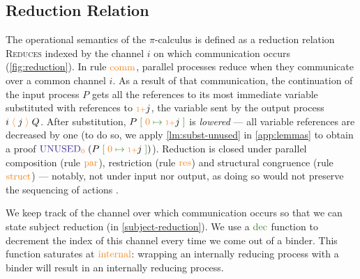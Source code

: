 \documentclass[a4paper,UKenglish,cleveref,autoref,thm-restate,authorcolumns]{lipics-v2019}
\theoremstyle{definition}
\newcommand{\picalc}{$\pi$-calculus}
\newcommand{\type}[1]{\textcolor{BlueViolet}{\operatorname{#1}}}
\newcommand{\constr}[1]{\textcolor{BurntOrange}{\operatorname{#1}}}
\newcommand{\func}[1]{\textcolor{OliveGreen}{\operatorname{#1}}}
\newcommand{\send}[2]{#1 \; \constr{\langle} \; #2 \;\constr{\rangle} \;}
\newcommand{\suc}{\constr{\scriptstyle 1+}}
\newcommand{\subst}[3]{#1 \; \func{[} \; #3 \; \func{\mapsto} \;#2 \; \func{]}}
\newcommand{\Unused}{\type{UNUSED}}
\begin{document}
\subsection{Reduction Relation}
\label{operational-semantics}

The operational semantics of the \picalc{} is defined as a reduction relation \textsc{Reduces} indexed by the channel $i$ on which communication occurs (\autoref{fig:reduction}).
In rule $\constr{comm}$, parallel processes reduce when they communicate over a common channel ${i}$.
As a result of that communication, the continuation of the input process $P$ gets all the references to its most immediate variable substituted with references to $\suc j$, the variable sent by the output process $\send{i}{j}{Q}$.
After substitution, $\subst{P}{\suc j}{\constr{0}}$ is \emph{lowered} --- all variable references are decreased by one (to do so, we apply \autoref{lm:subst-unused} in \autoref{app:lemmas} to obtain a proof $\Unused_{\constr{0}} \; (\subst{P}{\suc j}{\constr{0}})$).
Reduction is closed under parallel composition (rule $\constr{par}$), restriction (rule $\constr{res}$) and structural congruence (rule $\constr{struct}$) 
--- notably, not under input nor output, as doing so would not preserve the sequencing of actions \cite{Sangio01}.

We keep track of the channel over which communication occurs so that we can state subject reduction (in \autoref{subject-reduction}).
We use a $\func{dec}$ function to decrement the index of this channel every time we come out of a binder.
This function saturates at $\constr{internal}$: wrapping an internally reducing process with a binder will result in an internally reducing process.
\end{document}

